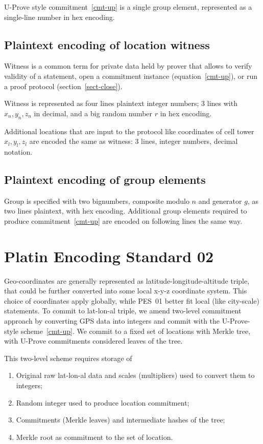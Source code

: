\documentclass[a4paper,12pt]{article}
\begin{document}
U-Prove style commitment~\eqref{cmt-up}
is a single group element,
represented as a single-line number in hex encoding.

\subsection{Plaintext encoding of location witness}

Witness is a common term for private data held by prover
that allows to verify validity of a statement,
open a commitment instance (equation~\eqref{cmt-up}),
or run a proof protocol (section~\ref{sect-close}).

Witness is represented as four lines plaintext integer numbers;
3 lines with $x_n, y_n, z_n$ in decimal,
and a big random number $r$ in hex encoding.

Additional locations that are input to the protocol
like coordinates of cell tower $x_l, y_l, z_l$
are encoded the same as witness:
3 lines, integer numbers, decimal notation.

\subsection{Plaintext encoding of group elements}

Group is specified with two bignumbers,
composite modulo $n$ and generator $g$,
as two lines plaintext, with hex encoding.
Additional group elements required to produce commitment~\eqref{cmt-up}
are encoded on following lines the same way.


\section{Platin Encoding Standard 02}

Geo-coordinates are generally represented as latitude-longitude-altitude triple,
that could be further converted into some local x-y-z coordinate system.
This choice of coordinates apply globally,
while PES~01 better fit local (like city-scale) statements.
To commit to lat-lon-al triple, we amend two-level commitment approach
by converting GPS data into integers and
commit with the U-Prove-style scheme~\eqref{cmt-up}.
We commit to a fixed set of locations with Merkle tree,
with U-Prove commitments considered leaves of the tree.

This two-level scheme requires storage of
\begin{enumerate}
\item
  Original raw lat-lon-al data and
  scales (multipliers) used to convert them to integers;
\item
  Random integer used to produce location commitment;
\item
  Commitments (Merkle leaves) and intermediate hashes of the tree;
\item
  Merkle root as commitment to the set of location.
\end{enumerate}
\end{document}
